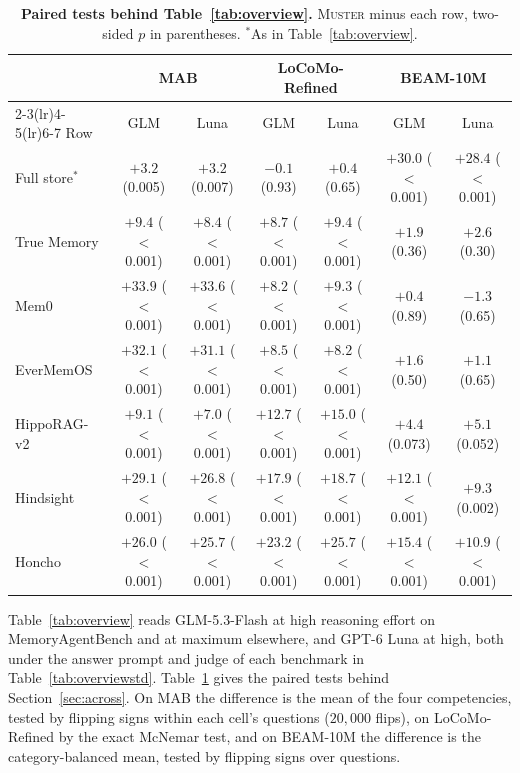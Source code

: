 \documentclass{article}
\newcommand{\tabfont}{\fontsize{7.5}{8.5}\selectfont\renewcommand{\arraystretch}{1.0}}
\newcommand{\sys}{\textsc{Muster}}
\begin{document}
\begin{table}[t]
\centering\tabfont
\caption{\textbf{Paired tests behind Table~\ref{tab:overview}.} \sys{} minus each row, two-sided $p$ in parentheses. $^\ast$As in Table~\ref{tab:overview}.}
\label{tab:t7paired}
\setlength{\tabcolsep}{2.5pt}
\begin{tabular}{lcccccc}
\toprule
 & \multicolumn{2}{c}{MAB} & \multicolumn{2}{c}{LoCoMo-Refined} & \multicolumn{2}{c}{BEAM-10M} \\
\cmidrule(lr){2-3}\cmidrule(lr){4-5}\cmidrule(lr){6-7}
Row & GLM & Luna & GLM & Luna & GLM & Luna \\
\midrule
Full store$^\ast$ & $+3.2$ (0.005) & $+3.2$ (0.007) & $-0.1$ (0.93) & $+0.4$ (0.65) & $+30.0$ ($<$0.001) & $+28.4$ ($<$0.001) \\
True Memory & $+9.4$ ($<$0.001) & $+8.4$ ($<$0.001) & $+8.7$ ($<$0.001) & $+9.4$ ($<$0.001) & $+1.9$ (0.36) & $+2.6$ (0.30) \\
Mem0 & $+33.9$ ($<$0.001) & $+33.6$ ($<$0.001) & $+8.2$ ($<$0.001) & $+9.3$ ($<$0.001) & $+0.4$ (0.89) & $-1.3$ (0.65) \\
EverMemOS & $+32.1$ ($<$0.001) & $+31.1$ ($<$0.001) & $+8.5$ ($<$0.001) & $+8.2$ ($<$0.001) & $+1.6$ (0.50) & $+1.1$ (0.65) \\
HippoRAG-v2 & $+9.1$ ($<$0.001) & $+7.0$ ($<$0.001) & $+12.7$ ($<$0.001) & $+15.0$ ($<$0.001) & $+4.4$ (0.073) & $+5.1$ (0.052) \\
Hindsight & $+29.1$ ($<$0.001) & $+26.8$ ($<$0.001) & $+17.9$ ($<$0.001) & $+18.7$ ($<$0.001) & $+12.1$ ($<$0.001) & $+9.3$ (0.002) \\
Honcho & $+26.0$ ($<$0.001) & $+25.7$ ($<$0.001) & $+23.2$ ($<$0.001) & $+25.7$ ($<$0.001) & $+15.4$ ($<$0.001) & $+10.9$ ($<$0.001) \\
\bottomrule
\end{tabular}
\end{table}

Table~\ref{tab:overview} reads GLM-5.3-Flash at high reasoning effort on MemoryAgentBench and at maximum elsewhere, and GPT-6 Luna at high, both under the answer prompt and judge of each benchmark in Table~\ref{tab:overviewstd}. Table~\ref{tab:t7paired} gives the paired tests behind Section~\ref{sec:across}. On MAB the difference is the mean of the four competencies, tested by flipping signs within each cell's questions ($20{,}000$ flips), on LoCoMo-Refined by the exact McNemar test, and on BEAM-10M the difference is the category-balanced mean, tested by flipping signs over questions.
\end{document}
